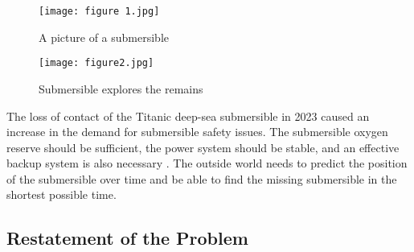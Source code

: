 \documentclass{mcmthesis}  %
\begin{document}
\begin{figure}[h]  %
\centering  %
\begin{minipage}[c]{0.48\textwidth}  %
\centering  %
\texttt{[image: figure 1.jpg]}  %
\caption{A picture of a submersible} \label{fig:A picture of a submersible}  %
\end{minipage}  %
\hspace{0.02\textwidth}
\begin{minipage}[c]{0.48\textwidth}  %
\centering  %
\texttt{[image: figure2.jpg]}  %
\caption{Submersible explores the remains } \label{fig:The submersible explores the remains of the ship on the sea floor}  %
\end{minipage}  %
\end{figure}  %
The loss of contact of the Titanic deep-sea submersible in 2023 caused an increase in the demand for submersible safety issues. The submersible oxygen reserve should be sufficient, the power system should be stable, and an effective backup system is also necessary \cite{Kirin}. The outside world needs to predict the position of the submersible over time and be able to find the missing submersible in the shortest possible time.



\subsection{Restatement of the Problem}
\end{document}
